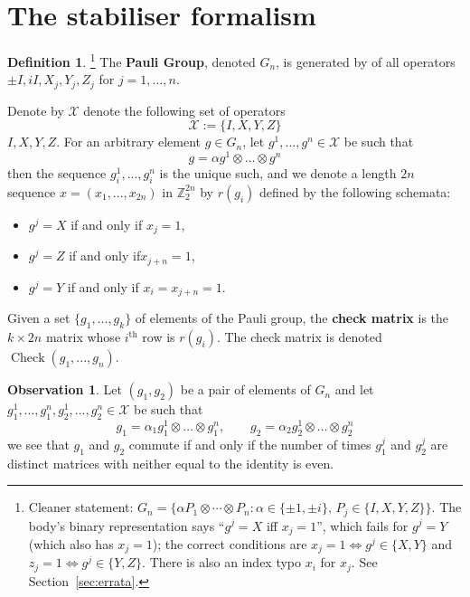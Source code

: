 \documentclass[12pt]{article}
\theoremstyle{plain}
\theoremstyle{definition}
\newtheorem{defn}[thm]{Definition} %
\newtheorem{observation}[thm]{Observation}
\newcommand{\bb}[1]{\mathbb{#1}}
\newcommand{\scr}[1]{\mathscr{#1}}
\begin{document}
\section{The stabiliser formalism}
\begin{defn}\footnote{Cleaner statement: $G_n=\{\alpha P_1\otimes\cdots\otimes P_n : \alpha\in\{\pm 1,\pm i\},\, P_j\in\{I,X,Y,Z\}\}$. The body's binary representation says ``$g^j=X$ iff $x_j=1$'', which fails for $g^j=Y$ (which also has $x_j=1$); the correct conditions are $x_j=1\iff g^j\in\{X,Y\}$ and $z_j=1\iff g^j\in\{Y,Z\}$. There is also an index typo $x_i$ for $x_j$. See Section~\ref{sec:errata}.}
The \textbf{Pauli Group}, denoted $G_n$, is generated by of all operators $\pm I,  i I, X_j, Y_j, Z_j$ for $j = 1,...,n$.

Denote by $\scr{X}$ denote the following set of operators
\begin{equation}
\scr{X} := \lbrace I,X,Y,Z\rbrace
\end{equation} $I,X, Y, Z$.
For an arbitrary element $g \in G_n$,  let $g^1,...,g^n \in \scr{X}$ be such that
\begin{equation}\label{eq:canonical_tensor}
g = \alpha g^1 \otimes \hdots \otimes g^n
\end{equation}
then the sequence $g_i^1,...,g_i^n$ is the unique such, and we denote a length $2n$ sequence $x = (x_1,...,x_{2n})$ in $\bb{Z}_2^{2n}$ by $r(g_i)$ defined by the following schemata:
\begin{itemize}
\item $g^j = X$ if and only if $x_j = 1$,
\item $g^j = Z$ if and only if$x_{j + n} = 1$,
\item $g^j = Y$ if and only if $x_i = x_{j+n} = 1$.
\end{itemize}
Given a set $\lbrace g_1,...,g_k\rbrace$ of elements of the Pauli group, the \textbf{check matrix} is the $k \times 2n$ matrix whose $i^\text{th}$ row is $r(g_i)$. The check matrix is denoted $\operatorname{Check}(g_1,...,g_n)$.
\end{defn}
\begin{observation}\label{obs:evenness}
Let $(g_1,g_2)$ be a pair of elements of $G_n$ and let $g_1^1,...,g_1^n, g_2^1,...,g_2^n \in \scr{X}$ be such that
\begin{equation}
g_1 = \alpha_1 g_1^1 \otimes \hdots \otimes g_1^n,\qquad g_2 = \alpha_2 g_2^1 \otimes \hdots \otimes g_2^n
\end{equation}
we see that $g_1$ and $g_2$ commute if and only if the number of times $g_1^j$ and $g_2^j$ are distinct matrices with neither equal to the identity is even. 
\end{observation}
\end{document}

